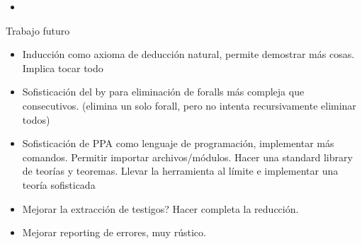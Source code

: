 \begin{itemize}
    \item {}
\end{itemize}

Trabajo futuro

\begin{itemize}
    \item Inducción como axioma de deducción natural, permite demostrar más
    cosas. Implica tocar todo
    \item Sofisticación del by para eliminación de foralls más compleja que
    consecutivos. (elimina un solo forall, pero no intenta recursivamente
    eliminar todos)
    \item Sofisticación de PPA como lenguaje de programación, implementar más
    comandos. Permitir importar archivos/módulos. Hacer una standard library
    de teorías y teoremas. Llevar la herramienta al límite e implementar una
    teoría sofisticada
    \item Mejorar la extracción de testigos? Hacer completa la reducción.
    \item Mejorar reporting de errores, muy rústico.
\end{itemize}
